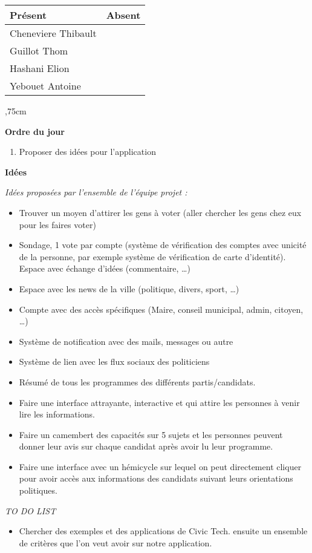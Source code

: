 \vskip 0.75cm

\begin{center}
\begin{tabular}[]{|l|l|}
     \hline 
     Présent & Absent\\
     \hline
     Cheneviere Thibault &\\ Guillot Thom & \\
     Hashani Elion &\\ Yebouet Antoine &\\
     \hline
\end{tabular}
\end{center}

,75cm

\noindent
\textbf{Ordre du jour}

\begin{enumerate}
    \item Proposer des idées pour l'application 
\end{enumerate}

\vskip 0.75cm

\noindent
\textbf{Idées}

\noindent
\textit{Idées proposées par l'ensemble de l'équipe projet : }
    
    \begin{itemize}
        \item Trouver un moyen d’attirer les gens à voter (aller chercher les gens chez eux pour les faires voter)
        \item Sondage, 1 vote par compte (système de vérification des comptes avec unicité de la personne, par exemple système de vérification de carte d’identité). Espace avec échange d’idées (commentaire, …)
        \item Espace avec les news de la ville (politique, divers, sport, …)
        \item Compte avec des accès spécifiques (Maire, conseil municipal, admin, citoyen, …)
        \item Système de notification avec des mails, messages ou autre
        \item Système de lien avec les flux sociaux des politiciens
        \item Résumé de tous les programmes des différents partis/candidats.
        \item Faire une interface attrayante, interactive et qui attire les personnes à venir lire les informations.
        \item Faire un camembert des capacités sur 5 sujets et les personnes peuvent donner leur avis sur chaque candidat après avoir lu leur programme.
        \item Faire une interface avec un hémicycle sur lequel on peut directement cliquer pour avoir accès aux informations des candidats suivant leurs orientations politiques.
    
    \end{itemize}
 
\vskip 1cm
\noindent
\textit{TO DO LIST}
\vskip 0.25cm

\begin{itemize}
    \item Chercher des exemples et des applications de Civic Tech.
     ensuite un ensemble de critères que l’on veut avoir sur notre application.
\end{itemize}

